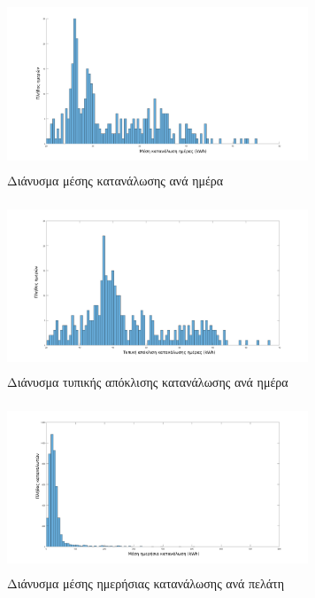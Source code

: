 \begin{figure}[ht!]
\centering
 \begin{subfigure}[b]{0.4\textwidth}
 \includegraphics[width=90mm, height=50mm]{../../plots/Consumption_Analysis/gr_hist_mean_days.png}
\caption{Διάνυσμα μέσης κατανάλωσης ανά ημέρα}
\label{fig:histmeandays}
 \end{subfigure}
\quad
 \begin{subfigure}[b]{0.4\textwidth}
 	\includegraphics[width=90mm, height=50mm]{../../plots/Consumption_Analysis/gr_hist_std_days.png}
	\caption{Διάνυσμα τυπικής απόκλισης κατανάλωσης ανά ημέρα}
	\label{fig:histstddays}
	\end{subfigure}
\quad
 \begin{subfigure}[b]{0.4\textwidth}
 \includegraphics[width=90mm, height=50mm]{../../plots/Consumption_Analysis/gr_hist_mean_year.png}
\caption{Διάνυσμα μέσης ημερήσιας κατανάλωσης ανά πελάτη}
\label{fig:histmeanyear}
 \end{subfigure}
\quad
 \begin{subfigure}[b]{0.4\textwidth}

\end{subfigure}
\end{figure}
